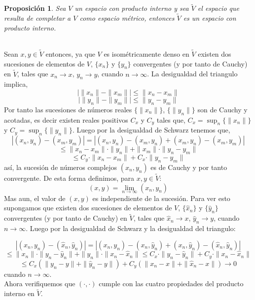 \documentclass[12pt]{book}
\numberwithin{equation}{chapter}
\newtheorem{proposition}[theorem]{Proposici\'on}
\def\n{\noindent}
\def\rar{\rightarrow}
\begin{document}
\begin{proposition}
Sea $V$ un espacio con producto interno y sea $\tilde{V}$ el espacio que resulta de completar a $V$ como espacio m\'etrico, entonces $\tilde{V}$ es un espacio con producto interno.
\end{proposition}
\n {\bf Demostraci\'on}\\
Sean $x,y \in \tilde{V}$ entonces, ya que $V$ es isom\'etricamente denso en $\tilde{V}$ existen dos sucesiones de elementos de $V$, $\{x_{n}\}$ y $\{y_{n}\}$ convergentes (y por tanto de Cauchy) en $\tilde{V}$, tales que $ x_{n} \rar x $, $ y_{n} \rar y $, cuando $n \rar \infty$. La desigualdad del triangulo implica,
$$ \Big| \|x_{n}\| - \|x_{m}\| \Big|\leq \| x_{n} - x_{m} \| $$
$$ \Big| \|y_{n}\| - \|y_{m}\| \Big|\leq \| y_{n} - y_{m} \| $$
Por tanto las sucesiones de n\'umeros reales $\{ \|x_{n}\| \}$, $\{ \|y_{n}\| \}$
son de Cauchy y acotadas, es decir existen reales positivos $C_{x}$ y $C_{y}$ tales que, $ C_{x}= \sup_{n} \{ \|x_{n}\| \} $ y $ C_{y}= \sup_{n} \{ \|y_{n}\| \} $. Luego por la desigualdad de Schwarz tenemos que,
$$ | (x_{n},y_{n})-(x_{m},y_{m}) | =| (x_{n},y_{n})- (x_{m},y_{n}) + (x_{m},y_{n}) -(x_{m},y_{m}) | $$
$$ \leq \| x_{n} - x_{m} \| \cdot \|y_{n}\| + \|x_{m}\| \cdot \|y_{n}-y_{m}\| $$
$$ \leq C_{y} \cdot \| x_{n} - x_{m} \| + C_{x} \cdot \|y_{n}-y_{m}\| $$
as\'i, la sucesi\'on de n\'umeros complejos $(x_{n},y_{n})$ es de Cauchy y por tanto convergente. De esta forma definimos, para $x,y \in \tilde{V}$:
$$ (x,y)= \lim_{n \rar \infty} (x_{n},y_{n}) $$
Mas aun, el valor de $(x,y)$ es independiente de la sucesi\'on. Para ver esto supongamos que existen dos sucesiones de elementos de $V$, $\{\hat{x}_{n}\}$ y $\{\hat{y}_{n}\}$ convergentes (y por tanto de Cauchy) en $\tilde{V}$, tales que $ \hat{x}_{n} \rar x $, $ \hat{y}_{n} \rar y $, cuando $n \rar \infty$. Luego por la desigualdad de Schwarz y la desigualdad del triangulo:

$$ | (x_{n},y_{n})-(\hat{x}_{n},\hat{y}_{n}) |= | (x_{n},y_{n}) -(x_{n},\hat{y}_{n})+ ( x_{n},\hat{y}_{n} ) -(\hat{x}_{n},\hat{y}_{n}) | $$
$$ \leq \| x_{n} \| \cdot \| y_{n}-\hat{y}_{n} \| + \| y_{n} \| \cdot \| x_{n}-\hat{x}_{n} \| \leq C_{x} \cdot \| y_{n}-\hat{y}_{n} \| + C_{y} \cdot \| x_{n}-\hat{x}_{n} \| $$
$$ \leq C_{x}( \|y_{n}-y\|+\|\hat{y}_{n}-y\| ) + C_{y}( \|x_{n}-x\|+\|\hat{x}_{n} - x\| ) \rar 0 $$
cuando $n \rar \infty$.\\
Ahora verifiquemos que $(\cdot , \cdot)$ cumple con las cuatro propiedades del producto interno en $\tilde{V}$. \\ 
\end{document}
